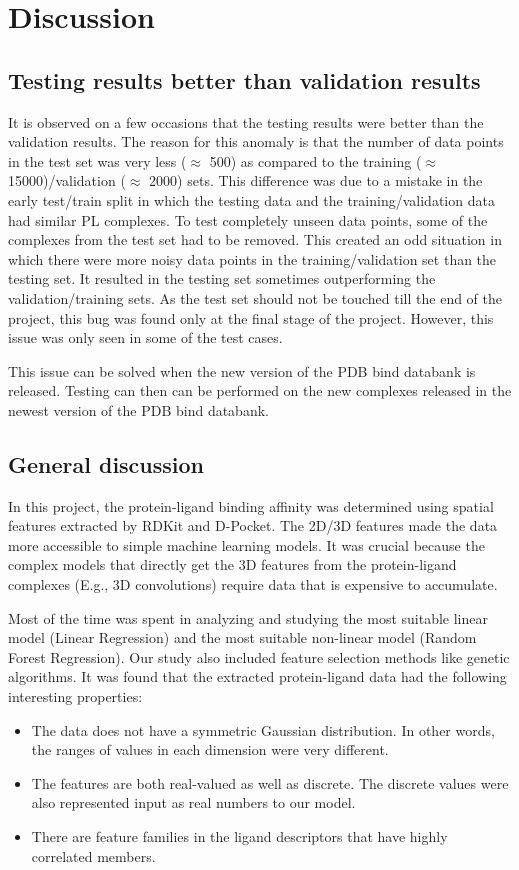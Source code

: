 \documentclass[11pt]{article}
\begin{document}
\section{Discussion}

\subsection{Testing results better than validation results}
\label{testingissuesection}
It is observed on a few occasions that the testing results were better than the validation results. The reason for this anomaly is that the number of data points in the test set was very less ($\approx$ 500) as compared to the training ($\approx$ 15000)/validation ($\approx$ 2000) sets. This difference was due to a mistake in the early test/train split in which the testing data and the training/validation data had similar PL complexes. To test completely unseen data points, some of the complexes from the test set had to be removed. This created an odd situation in which there were more noisy data points in the training/validation set than the testing set. It resulted in the testing set sometimes outperforming the validation/training sets. As the test set should not be touched till the end of the project, this bug was found only at the final stage of the project.
However, this issue was only seen in some of the test cases.

This issue can be solved when the new version of the PDB bind databank is released. Testing can then can be performed on the new complexes released in the newest version of the PDB bind databank.

\subsection{General discussion}
In this project, the protein-ligand binding affinity was determined using spatial features extracted by RDKit and D-Pocket.
The 2D/3D features made the data more accessible to simple machine learning models. 
It was crucial because the complex models that directly get the 3D features from the protein-ligand complexes (E.g., 3D convolutions) require data that is expensive to accumulate.

Most of the time was spent in analyzing and studying the most suitable linear model (Linear Regression) and the most suitable non-linear model (Random Forest Regression).
Our study also included feature selection methods like genetic algorithms.
It was found that the extracted protein-ligand data had the following interesting properties:
\begin{itemize}
\item The data does not have a symmetric Gaussian distribution.  In other words, the ranges of values in each dimension were very different.
\item The features are both real-valued as well as discrete.  The discrete values were also represented input as real numbers to our model.
\item There are feature families in the ligand descriptors that have highly correlated members.
\end{itemize}
\end{document}
